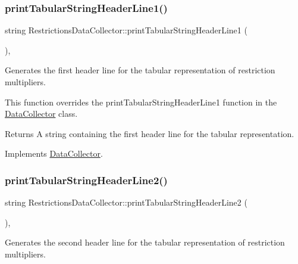 \subsubsection{\texorpdfstring{print\+Tabular\+String\+Header\+Line1()}{printTabularStringHeaderLine1()}}
{\footnotesize\ttfamily string Restrictions\+Data\+Collector\+::print\+Tabular\+String\+Header\+Line1 (\begin{DoxyParamCaption}{ }\end{DoxyParamCaption})\hspace{0.3cm}{\ttfamily [override]}, {\ttfamily [virtual]}}



Generates the first header line for the tabular representation of restriction multipliers. 

This function overrides the {\ttfamily print\+Tabular\+String\+Header\+Line1} function in the {\ttfamily \mbox{\hyperlink{classDataCollector}{Data\+Collector}}} class.

\begin{DoxyReturn}{Returns}
A string containing the first header line for the tabular representation. 
\end{DoxyReturn}


Implements \mbox{\hyperlink{classDataCollector_a91619cfa9e9b8cefd2f7c20d5718b41e}{Data\+Collector}}.

\mbox{\label{classRestrictionsDataCollector_afb3c49c2c9b152bb2372e2fcc198e1b8}} 
\subsubsection{\texorpdfstring{print\+Tabular\+String\+Header\+Line2()}{printTabularStringHeaderLine2()}}
{\footnotesize\ttfamily string Restrictions\+Data\+Collector\+::print\+Tabular\+String\+Header\+Line2 (\begin{DoxyParamCaption}{ }\end{DoxyParamCaption})\hspace{0.3cm}{\ttfamily [override]}, {\ttfamily [virtual]}}



Generates the second header line for the tabular representation of restriction multipliers. 

